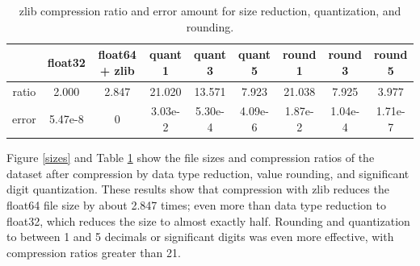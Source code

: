 \documentclass[11pt]{article}
\begin{document}
\begin{table}[h!]
    \centering
    \begin{tabular}{c | c c c c c c c c}
        & float32 & float64 + zlib & quant 1 & quant 3 & quant 5 & round 1 & round 3 & round 5 \\
        \hline
        ratio & 2.000 & 2.847 & 21.020 & 13.571 & 7.923 & 21.038 & 7.925 & 3.977 \\
        error & 5.47e-8 & 0 & 3.03e-2 & 5.30e-4 & 4.09e-6 & 1.87e-2 & 1.04e-4 & 1.71e-7 \\
    \end{tabular}
    \caption{zlib compression ratio and error amount for size reduction, quantization, and rounding.}
    \label{ratios}
\end{table}

Figure \ref{sizes} and Table \ref{ratios} show the file sizes and compression ratios of the dataset after compression by data type reduction, value rounding, and significant digit quantization. These results show that compression with zlib reduces the float64 file size by about 2.847 times; even more than data type reduction to float32, which reduces the size to almost exactly half. Rounding and quantization to between 1 and 5 decimals or significant digits was even more effective, with compression ratios greater than 21.
\end{document}
